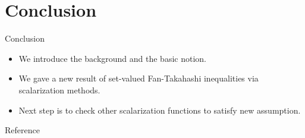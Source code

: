\documentclass[aspectratio=169, dvipdfmx, 11pt]{beamer}
\newcommand{\Interior}[1]{\text{\rm int\:${#1}$}} %
\newcommand{\notsetrel}[2]{{\not\preccurlyeq}^{(#1)}_{#2}\!}
\begin{document}


\section{Conclusion}

\begin{frame}{Conclusion}
  \begin{itemize}
    \item We introduce the background and the basic notion.
    \item We gave a new result of set-valued Fan-Takahashi inequalities via scalarization methods.
    \item Next step is to check other scalarization functions to satisfy new assumption.
  \end{itemize}
\end{frame}

\begin{frame}[allowframebreaks]{Reference}
  \printbibliography
\end{frame}
\end{document}

